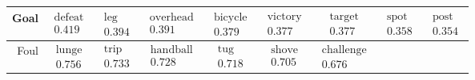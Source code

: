 \documentclass[10pt, a4paper]{UUThesisTemplate}
\begin{document}
\begin{table}[hb]
\scriptsize
\hspace{-0.2cm}
\begin{tabular}{r|c c c c c c c c}
Goal
 & $\begin{matrix}\text{defeat}\\0.419\end{matrix}$
 & $\begin{matrix}\text{leg}\\0.394\end{matrix}$
 & $\begin{matrix}\text{overhead}\\0.391\end{matrix}$
 & $\begin{matrix}\text{bicycle}\\0.379\end{matrix}$
 & $\begin{matrix}\text{victory}\\0.377\end{matrix}$
  & $\begin{matrix}\text{target}\\0.377\end{matrix}$
 & $\begin{matrix}\text{spot}\\0.358\end{matrix}$
 & $\begin{matrix}\text{post}\\0.354\end{matrix}$
\\\hline
Foul
 & $\begin{matrix}\text{lunge}\\0.756\end{matrix}$
 & $\begin{matrix}\text{trip}\\0.733\end{matrix}$
 & $\begin{matrix}\text{handball}\\0.728\end{matrix}$
 & $\begin{matrix}\text{tug}\\0.718\end{matrix}$
 & $\begin{matrix}\text{shove}\\0.705\end{matrix}$
 & $\begin{matrix}\text{challenge}\\0.676\end{matrix}$

\end{tabular}
\end{table}
\end{document}
